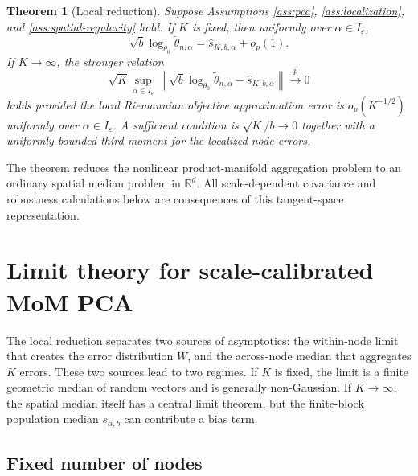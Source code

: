 \documentclass[11pt]{article}
\newtheorem{theorem}{Theorem}
\newcommand{\R}{\mathbb R}
\newcommand{\pto}{\stackrel{p}{\to}}
\newcommand{\eps}{\varepsilon}
\begin{document}
\begin{theorem}[Local reduction]\label{thm:local-reduction}
Suppose Assumptions \ref{ass:pca}, \ref{ass:localization}, and \ref{ass:spatial-regularity} hold.  If \(K\) is fixed, then uniformly over \(\alpha\in I_\eps\),
\begin{equation}\label{eq:local-reduction-fixed}
    \sqrt b\log_{\theta_0}\widetilde\theta_{n,\alpha}
    =\widehat s_{K,b,\alpha}+o_p(1).
\end{equation}
If \(K\to\infty\), the stronger relation
\begin{equation}\label{eq:local-reduction-growing}
    \sqrt K\sup_{\alpha\in I_\eps}
    \left\|
    \sqrt b\log_{\theta_0}\widetilde\theta_{n,\alpha}
    -\widehat s_{K,b,\alpha}
    \right\|
    \pto0
\end{equation}
 holds provided the local Riemannian objective approximation error is \(o_p(K^{-1/2})\) uniformly over \(\alpha\in I_\eps\).  A sufficient condition is \(\sqrt K/b\to0\) together with a uniformly bounded third moment for the localized node errors.
\end{theorem}

The theorem reduces the nonlinear product-manifold aggregation problem to an ordinary spatial median problem in \(\R^d\).  All scale-dependent covariance and robustness calculations below are consequences of this tangent-space representation.


\section{Limit theory for scale-calibrated MoM PCA}\label{sec:limits}

The local reduction separates two sources of asymptotics: the within-node limit that creates the error distribution \(W\), and the across-node median that aggregates \(K\) errors.  These two sources lead to two regimes.  If \(K\) is fixed, the limit is a finite geometric median of random vectors and is generally non-Gaussian.  If \(K\to\infty\), the spatial median itself has a central limit theorem, but the finite-block population median \(s_{\alpha,b}\) can contribute a bias term.

\subsection{Fixed number of nodes}
\end{document}
